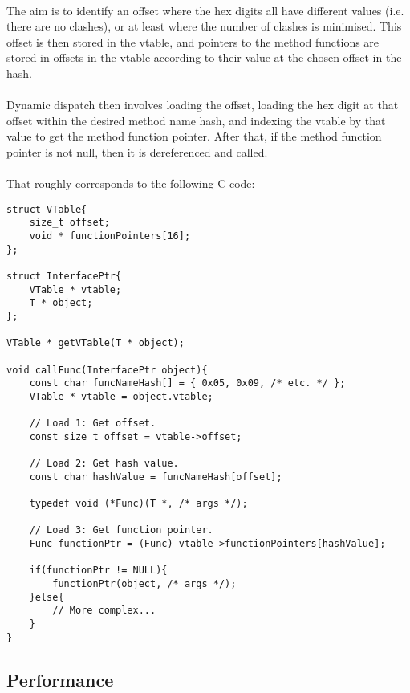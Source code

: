 \documentclass[12pt,twoside,notitlepage]{report}
\begin{document}
\paragraph{}
The aim is to identify an offset where the hex digits all have different values (i.e. there are no clashes), or at least where the number of clashes is minimised. This offset is then stored in the vtable, and pointers to the method functions are stored in offsets in the vtable according to their value at the chosen offset in the hash.

\paragraph{}
Dynamic dispatch then involves loading the offset, loading the hex digit at that offset within the desired method name hash, and indexing the vtable by that value to get the method function pointer. After that, if the method function pointer is not null, then it is dereferenced and called.

\paragraph{}
That roughly corresponds to the following C code:

\begin{lstlisting}
struct VTable{
	size_t offset;
	void * functionPointers[16];
};

struct InterfacePtr{
	VTable * vtable;
	T * object;
};

VTable * getVTable(T * object);

void callFunc(InterfacePtr object){
	const char funcNameHash[] = { 0x05, 0x09, /* etc. */ };
	VTable * vtable = object.vtable;
	
	// Load 1: Get offset.
	const size_t offset = vtable->offset;
	
	// Load 2: Get hash value.
	const char hashValue = funcNameHash[offset];
	
	typedef void (*Func)(T *, /* args */);
	
	// Load 3: Get function pointer.
	Func functionPtr = (Func) vtable->functionPointers[hashValue];
	
	if(functionPtr != NULL){
		functionPtr(object, /* args */);
	}else{
		// More complex...
	}
}
\end{lstlisting}

\subsection{Performance}
\end{document}
